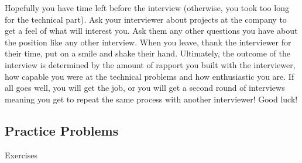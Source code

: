 \documentclass[11pt,oneside]{book}
\begin{document}
Hopefully you have time left before the interview (otherwise, you took too long for the technical part). Ask your interviewer about projects at the company to get a feel of what will interest you. Ask them any other questions you have about the position like any other interview. When you leave, thank the interviewer for their time, put on a smile and shake their hand. Ultimately, the outcome of the interview is determined by the amount of rapport you built with the interviewer, how capable you were at the technical problems and how enthusiastic you are. If all goes well, you will get the job, or you will get a second round of interviews meaning you get to repeat the same process with another interviewer! Good luck!

\subsection{Practice Problems}

Exercises
\end{document}
